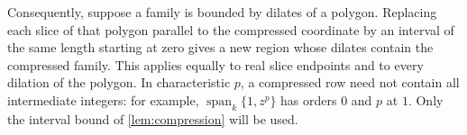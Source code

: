 Consequently, suppose a family is bounded by dilates of a polygon. Replacing each slice of that polygon parallel to the compressed coordinate by an interval of the same length starting at zero gives a new region whose dilates contain the compressed family.  This applies equally to real slice endpoints and to every dilation of the polygon.  In characteristic $p$, a compressed row need not contain all intermediate integers: for example, $\operatorname{span}_k\{1,z^p\}$ has orders $0$ and $p$ at $1$.  Only the interval bound of \cref{lem:compression} will be used.
